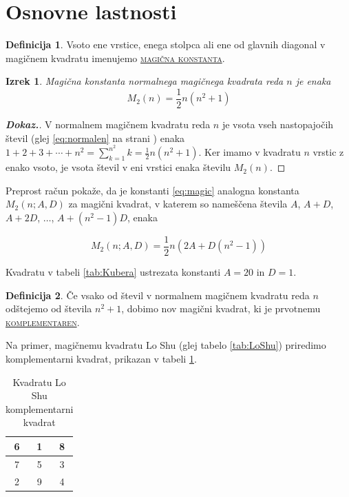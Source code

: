 \documentclass[a4paper,12pt]{article}
\newcommand{\pojem}[1]{\underline{\textsc{#1}}}
\theoremstyle{definition}
\newtheorem{definicija}{Definicija}
\theoremstyle{plain}
\newtheorem{izrek}{Izrek}
\newenvironment{dokaz}{
   \begin{proof}[\textnormal{\textbf{Dokaz.}}]%
}{      
   \end{proof}%
}
\newenvironment{magic}[3]{
   \begin{table}[!ht]%
   \centering%
   \caption{#2}%
   \label{#3}%
   \large
   \begin{tabular}{|*{#1}{c|}}%
      \hline
}{
   \end{tabular}%
   \end{table}%
}
\begin{document}

\section{Osnovne lastnosti}
\begin{definicija}
   Vsoto ene vrstice, enega stolpca ali ene od glavnih diagonal
   v magičnem kvadratu imenujemo \pojem{magična konstanta}.
\end{definicija}

\begin{izrek}
   Magična konstanta normalnega magičnega kvadrata reda $n$
   je enaka
   \begin{equation}
      \label{eq:magic}
      M_2(n) = \frac{1}{2} n(n^2 + 1)
   \end{equation}
\end{izrek}

\begin{dokaz}
   V normalnem magičnem kvadratu reda $n$ je vsota vseh nastopajočih
   števil (glej \eqref{eq:normalen} na strani \pageref{eq:normalen}) enaka
   $1 + 2 + 3 + \cdots + n^2 = \sum_{k=1}^{n^2}k = \frac{1}{2} n(n^2 + 1)$. Ker imamo
   v kvadratu $n$ vrstic z enako vsoto, je vsota števil v eni vrstici
   enaka številu $M_2(n)$.
\end{dokaz}

Preprost račun pokaže, da je konstanti \eqref{eq:magic} analogna konstanta
$M_2(n; A, D)$ za magični kvadrat, v katerem so nameščena števila
$A$, $A + D$, $A + 2D$, $\dots$, $A + (n^2 - 1)D$, enaka

\begin{equation*}
   M_2(n; A, D) = \frac{1}{2} n(2A + D(n^2 - 1))
\end{equation*}

Kvadratu v tabeli \ref{tab:Kubera} ustrezata konstanti $A = 20$ in $D = 1$.

\begin{definicija}
   Če vsako od števil v normalnem magičnem kvadratu reda $n$ odštejemo
   od števila $n^2 + 1$, dobimo nov magični kvadrat, ki je prvotnemu
   \pojem{komplementaren}.
\end{definicija}

Na primer, magičnemu kvadratu Lo Shu (glej tabelo \ref{tab:LoShu}) priredimo
komplementarni kvadrat, prikazan v tabeli \ref{tab:Komplement}.

\begin{magic}{3}{Kvadratu Lo Shu komplementarni kvadrat}{tab:Komplement}
   6 & 1 & 8 \\\hline
   7 & 5 & 3 \\\hline
   2 & 9 & 4 \\\hline
\end{magic}
\end{document}

